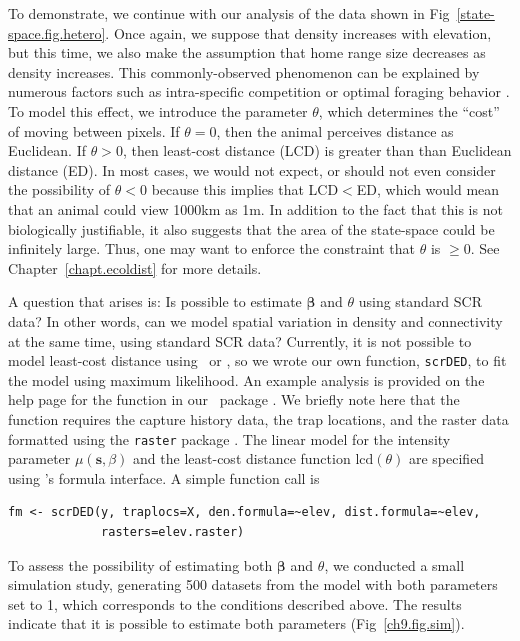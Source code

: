 To demonstrate, we continue with our analysis of the data shown in
Fig~\ref{state-space.fig.hetero}. Once again, we suppose that density
increases with elevation, but this time, we also make the
assumption that home range size decreases as density increases. This
commonly-observed phenomenon can be explained by numerous factors such
as intra-specific competition \citep{sillett_etal:2004} or optimal
foraging behavior \citep{tufto_etal:1996,said_servanty:2005}. To model
this effect, we
introduce the parameter $\theta$, which determines the ``cost'' of
moving between pixels. If $\theta=0$, then the animal perceives
distance as Euclidean. If $\theta>0$, then least-cost distance (LCD)
is greater than than Euclidean distance (ED). In most cases, we would
not expect,
or should not even consider the possibility of $\theta<0$ because this
implies that LCD$<$ED, which would mean that an animal could view
1000km as 1m. In addition to the fact that this is not biologically
justifiable, it also suggests that the area of the state-space could
be infinitely large. Thus, one may want to enforce the constraint that
$\theta$ is $\geq 0$. See Chapter~\ref{chapt.ecoldist} for
more details.

A question that arises is: Is possible to estimate $\bm \beta$
and $\theta$ using standard SCR data? In other words, can we model
spatial variation in density and connectivity at the same time,
using standard SCR data? Currently, it is not possible to
model least-cost distance using \jags~or \secr, so we wrote our own
function, \verb+scrDED+, to fit the model using maximum likelihood. An
example analysis is provided on the help page for the function in our
\R~package \scrbook. We briefly note here that the function requires
the capture history data, the trap locations, and the raster data
formatted using the {\tt raster} package
\citep{hijmans_vanetten:2012}. The linear model for the
intensity parameter $\mu(\mathbf{s}, \beta)$ and the least-cost distance
function $\text{lcd}(\theta)$ are specified using \R's formula interface. A
simple function call is
\begin{verbatim}
fm <- scrDED(y, traplocs=X, den.formula=~elev, dist.formula=~elev,
             rasters=elev.raster)
\end{verbatim}
To assess the possibility of estimating both $\bm \beta$ and $\theta$, we
conducted a small simulation study, generating 500 datasets from the
model with both parameters set to 1, which corresponds to the
conditions described above. The results indicate that it is
possible to estimate both parameters
(Fig~\ref{ch9.fig.sim}).

